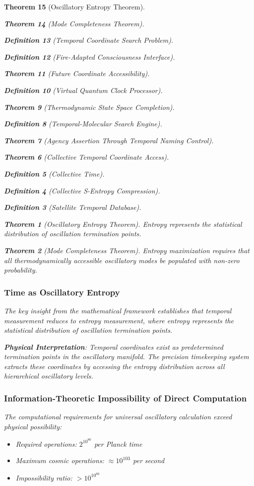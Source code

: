 \documentclass[12pt,a4paper]{article}
\newtheorem{theorem}{Theorem}[section]
\newtheorem{definition}[theorem]{Definition}
\begin{document}
\begin{theorem}[Oscillatory Entropy Theorem]
\begin{theorem}[Mode Completeness Theorem]
\begin{enumerate}
\begin{definition}[Temporal Coordinate Search Problem]
\begin{algorithm}
\begin{definition}[Fire-Adapted Consciousness Interface]
\begin{theorem}[Future Coordinate Accessibility]
\begin{definition}[Virtual Quantum Clock Processor]
\begin{itemize}
\begin{itemize}
\begin{theorem}[Thermodynamic State Space Completion]
\begin{definition}[Temporal-Molecular Search Engine]
\begin{theorem}[Agency Assertion Through Temporal Naming Control]
\begin{remark}
\begin{theorem}[Collective Temporal Coordinate Access]
\begin{definition}[Collective Time]
\begin{definition}[Collective S-Entropy Compression]
\begin{definition}[Satellite Temporal Database]
\begin{algorithm}
\begin{table}[h]
{{\begin{theorem}[Oscillatory Entropy Theorem]
Entropy represents the statistical distribution of oscillation termination points.
\end{theorem}

\begin{theorem}[Mode Completeness Theorem]
Entropy maximization requires that all thermodynamically accessible oscillatory modes be populated with non-zero probability.
\end{theorem}

\subsubsection{Time as Oscillatory Entropy}

The key insight from the mathematical framework establishes that temporal measurement reduces to entropy measurement, where entropy represents the statistical distribution of oscillation termination points.

\textbf{Physical Interpretation}: Temporal coordinates exist as predetermined termination points in the oscillatory manifold. The precision timekeeping system extracts these coordinates by accessing the entropy distribution across all hierarchical oscillatory levels.

\subsubsection{Information-Theoretic Impossibility of Direct Computation}

The computational requirements for universal oscillatory calculation exceed physical possibility:

\begin{itemize}
\item Required operations: $2^{10^{80}}$ per Planck time
\item Maximum cosmic operations: $\approx 10^{103}$ per second
\item Impossibility ratio: $> 10^{10^{80}}$
\end{itemize}

}}
\end{table}
\end{algorithm}
\end{definition}
\end{definition}
\end{definition}
\end{theorem}
\end{remark}
\end{theorem}
\end{definition}
\end{theorem}
\end{itemize}
\end{itemize}
\end{definition}
\end{theorem}
\end{definition}
\end{algorithm}
\end{definition}
\end{enumerate}
\end{theorem}
\end{theorem}
\end{document}
